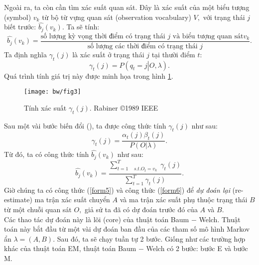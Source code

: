 Ngoài ra, ta còn cần tìm xác suất quan sát. Đây là xác suất của một biểu tượng (symbol) $v_k$ từ bộ từ vựng quan sát (observation vocabulary) $V,$ với trạng thái $j$ biết trước: $\widehat{b_j}\left( {v_k} \right).$ Ta sẽ tính:
\begin{equation}
\widehat {{b_j}}\left( {{v_k}} \right) = \frac{\text{số lượng kỳ vọng thời điểm có trạng thái } j \text{ và biểu tượng quan sát} v_k}{\text{số lượng các thời điểm có trạng thái } j}.
\end{equation}
Ta định nghĩa $\gamma_t \left( j \right)$ là xác suất ở trạng thái $j$ tại thười điểm $t:$
\begin{equation}
{\gamma _t}\left( j \right) = P\left( {\left. {{q_t} = j} \right|O,\lambda } \right).
\end{equation}
Quá trình tính giá trị này được minh họa trong hình \ref{bw_fig3}.
\begin{figure}[H]
\begin{center}
\texttt{[image: bw/fig3]}
\end{center}
\caption{Tính xác suất $\gamma_t \left( j \right).$ Rabiner \copyright 1989 IEEE \label{bw_fig3}}
\end{figure}
Sau một vài bước biến đổi (\cite{hmm2021}), ta được công thức tính $\gamma_t \left( j \right)$ như sau:
\begin{equation}
{\gamma _t}\left( j \right) = \frac{{{\alpha _t}\left( j \right){\beta _t}\left( j \right)}}{{P\left( {\left. O \right|\lambda } \right)}}.
\end{equation}
Từ đó, ta có công thức tính $\widehat {{b_j}}\left( {{v_k}} \right)$ như sau:
\begin{equation}
\widehat {{b_j}}\left( {{v_k}} \right) = \frac{{\sum\nolimits_{t = 1\begin{array}{*{20}{c}}
  {}&{s.t.{O_t} = {v_k}} 
\end{array}}^T {{\gamma _t}\left( j \right)} }}{{\sum\nolimits_{t = 1}^T {{\gamma _t}\left( j \right)} }}.
\label{form6}
\end{equation}
Giờ chúng ta có công thức (\ref{form5}) và công thức (\ref{form6}) để \textit{dự đoán lại} (re-estimate) ma trận xác suất chuyển $A$ và ma trận xác suất phụ thuộc trạng thái $B$ từ một chuỗi quan sát $O,$ giả sử ta đã có dự đoán trước đó của $A$ và $B.$\\
Các thao tác dự đoán này là lõi (core) của thuật toán Baum $-$ Welch. Thuật toán này bắt đầu từ một vài dự đoán ban đầu của các tham số mô hình Markov ẩn $\lambda = \left( {A, B} \right).$  Sau đó, ta sẽ chạy tuần tự 2 bước. Giống như các trường hợp khác của thuật toán EM, thuật toán Baum $-$ Welch có 2 bước: bước E và bước M.\\
